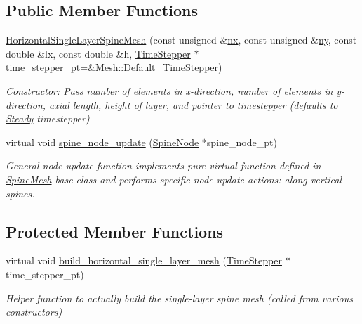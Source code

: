 \subsection*{Public Member Functions}
\begin{DoxyCompactItemize}
\item 
\hyperlink{classoomph_1_1HorizontalSingleLayerSpineMesh_a765856597150d37a20eabdb53e58d49c}{Horizontal\+Single\+Layer\+Spine\+Mesh} (const unsigned \&\hyperlink{classoomph_1_1RectangularQuadMesh_abfef93d6322886cdce14a437186e4821}{nx}, const unsigned \&\hyperlink{classoomph_1_1RectangularQuadMesh_a86d76a55eb7c4e8bca9b74d23c8b0412}{ny}, const double \&lx, const double \&h, \hyperlink{classoomph_1_1TimeStepper}{Time\+Stepper} $\ast$time\+\_\+stepper\+\_\+pt=\&\hyperlink{classoomph_1_1Mesh_a12243d0fee2b1fcee729ee5a4777ea10}{Mesh\+::\+Default\+\_\+\+Time\+Stepper})
\begin{DoxyCompactList}\small\item\em Constructor\+: Pass number of elements in x-\/direction, number of elements in y-\/direction, axial length, height of layer, and pointer to timestepper (defaults to \hyperlink{classoomph_1_1Steady}{Steady} timestepper) \end{DoxyCompactList}\item 
virtual void \hyperlink{classoomph_1_1HorizontalSingleLayerSpineMesh_a4b9b833a281aa64a809b4e47159282e6}{spine\+\_\+node\+\_\+update} (\hyperlink{classoomph_1_1SpineNode}{Spine\+Node} $\ast$spine\+\_\+node\+\_\+pt)
\begin{DoxyCompactList}\small\item\em General node update function implements pure virtual function defined in \hyperlink{classoomph_1_1SpineMesh}{Spine\+Mesh} base class and performs specific node update actions\+: along vertical spines. \end{DoxyCompactList}\end{DoxyCompactItemize}
\subsection*{Protected Member Functions}
\begin{DoxyCompactItemize}
\item 
virtual void \hyperlink{classoomph_1_1HorizontalSingleLayerSpineMesh_a9bd06cd24d2c48c499bf149b1773b442}{build\+\_\+horizontal\+\_\+single\+\_\+layer\+\_\+mesh} (\hyperlink{classoomph_1_1TimeStepper}{Time\+Stepper} $\ast$time\+\_\+stepper\+\_\+pt)
\begin{DoxyCompactList}\small\item\em Helper function to actually build the single-\/layer spine mesh (called from various constructors) \end{DoxyCompactList}\end{DoxyCompactItemize}
